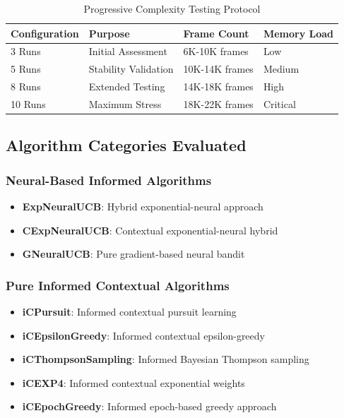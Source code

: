 \documentclass[12pt,a4paper]{article}
\begin{document}
\begin{table}[H]
\centering
\caption{Progressive Complexity Testing Protocol}
\begin{tabular}{|l|l|l|l|}
\hline
\textbf{Configuration} & \textbf{Purpose} & \textbf{Frame Count} & \textbf{Memory Load} \\
\hline
\hline
3 Runs & Initial Assessment & 6K-10K frames & Low \\
5 Runs & Stability Validation & 10K-14K frames & Medium \\
8 Runs & Extended Testing & 14K-18K frames & High \\
10 Runs & Maximum Stress & 18K-22K frames & Critical \\
\hline
\end{tabular}
\end{table}

\subsection{Algorithm Categories Evaluated}

\subsubsection{Neural-Based Informed Algorithms}
\begin{itemize}
\item \textbf{ExpNeuralUCB}: Hybrid exponential-neural approach
\item \textbf{CExpNeuralUCB}: Contextual exponential-neural hybrid  
\item \textbf{GNeuralUCB}: Pure gradient-based neural bandit
\end{itemize}

\subsubsection{Pure Informed Contextual Algorithms}
\begin{itemize}
\item \textbf{iCPursuit}: Informed contextual pursuit learning
\item \textbf{iCEpsilonGreedy}: Informed contextual epsilon-greedy
\item \textbf{iCThompsonSampling}: Informed Bayesian Thompson sampling
\item \textbf{iCEXP4}: Informed contextual exponential weights
\item \textbf{iCEpochGreedy}: Informed epoch-based greedy approach
\end{itemize}
\end{document}
